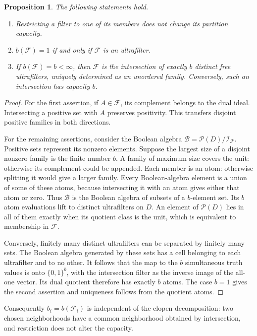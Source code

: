 \documentclass[11pt,letterpaper]{article}
\numberwithin{equation}{section}
\newtheorem{proposition}[proposition]{Proposition}
\theoremstyle{definition}
\theoremstyle{remark}
\theoremstyle{definition}
\newcommand{\F}{\mathcal F}
\newcommand{\I}{\mathcal I}
\newcommand{\B}{\mathcal B}
\newcommand{\PP}{\mathcal P}
\begin{document}
\begin{proposition}\label{fp:prop:finite-capacity}
The following statements hold.
\begin{enumerate}
\item Restricting a filter to one of its members does not change its
partition capacity.
\item \(b(\F)=1\) if and only if \(\F\) is an ultrafilter.
\item If \(b(\F)=b<\infty\), then \(\F\) is the intersection of
exactly \(b\) distinct free ultrafilters, uniquely determined as an unordered
family. Conversely, such an intersection has capacity \(b\).
\end{enumerate}
\end{proposition}
\begin{proof}
For the first assertion, if \(A\in\F\), its complement belongs to the
dual ideal. Intersecting a positive set with \(A\) preserves positivity.
This transfers disjoint positive families in both directions.

For the remaining assertions, consider the Boolean algebra
\(\B=\PP(D)/\I_{\F}\). Positive sets represent its nonzero elements.
Suppose the largest size of a disjoint nonzero family is the finite number
\(b\). A family of maximum size covers the unit: otherwise its complement
could be appended. Each member is an atom: otherwise splitting it would
give a larger family. Every Boolean-algebra element is a union of some of
these atoms, because intersecting it with an atom gives either that atom
or zero. Thus \(\B\) is the Boolean algebra of subsets of a \(b\)-element
set. Its \(b\) atom evaluations lift to distinct ultrafilters on \(D\).
An element of \(\PP(D)\) lies in all of them exactly when its quotient
class is the unit, which is equivalent to membership in \(\F\).

Conversely, finitely many distinct ultrafilters can be separated by finitely
many sets. The Boolean algebra generated by these sets has a cell belonging
to each ultrafilter and to no other. It follows that the map to the
\(b\) simultaneous truth values is onto \(\{0,1\}^b\), with the
intersection filter as the inverse image of the all-one vector. Its dual
quotient therefore has exactly \(b\) atoms. The case \(b=1\) gives the
second assertion and uniqueness follows from the quotient atoms.
\end{proof}

Consequently \(b_i=b(\F_i)\) is independent of the clopen decomposition:
two chosen neighborhoods have a common neighborhood obtained by
intersection, and restriction does not alter the capacity.
\end{document}
